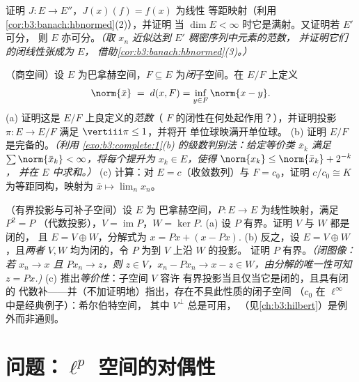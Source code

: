 \begin{exercise}[$\star\star$]\label{exo:b3:banach:10}
证明 $J \colon E \to E''$，$J(x)(f) = f(x)$ 为线性
等距映射（利用\cref{cor:b3:banach:hbnormed}(2)），并证明
当 $\dim E < \infty$ 时它是满射。又证明若 $E'$ 可分，
则 $E$ 亦可分。\emph{（取 $x_n$ 近似达到 $E'$ 稠密序列中元素的范数，
并证明它们的闭线性张成为 $E$，
借助\cref{cor:b3:banach:hbnormed}(3)。）}
\end{exercise}

\begin{exercise}[$\star\star$]\label{exo:b3:banach:11}
（商空间）设 $E$ 为巴拿赫空间，$F \subseteq
E$ 为\emph{闭}子空间。在 $E/F$ 上定义
\[
\norm{\bar x} \;=\; d(x, F) = \inf_{y\in F}\norm{x - y} .
\]
(a) 证明这是 $E/F$ 上良定义的\emph{范数}（
$F$ 的闭性在何处起作用？），并证明投影 $\pi
\colon E \to E/F$ 满足 $\vertiii\pi \leq 1$，并将开
单位球映满开单位球。
(b) 证明 $E/F$ 是完备的。\emph{（利用
\cref{exo:b3:complete:1}(b) 的级数判别法：给定等价类
$\bar x_k$ 满足 $\sum\norm{\bar x_k} < \infty$，将每个提升为
$x_k \in E$，使得 $\norm{x_k} \leq \norm{\bar x_k} + 2^{-k}$，
并在 $E$ 中求和。）}
(c) 计算：对 $E = c$（收敛数列）与 $F =
c_0$，证明 $c/c_0 \cong K$ 为等距同构，映射为 $\bar x \mapsto
\lim_nx_n$。
\end{exercise}

\begin{exercise}[$\star\star$]\label{exo:b3:banach:12}
（有界投影与可补子空间）设 $E$ 为
巴拿赫空间，$P \colon E \to E$ 为线性映射，满足 $P^2 = P$
（代数投影），$V = \operatorname{im}P$，$W =
\ker P$.
(a) 设 $P$ 有界。证明 $V$ 与 $W$ 都是闭的，
且 $E = V \oplus W$，分解式为 $x = Px + (x -
Px)$.
(b) 反之，设 $E = V \oplus W$，且\emph{两者} $V,
W$ 均为闭的，令 $P$ 为到 $V$ 上沿 $W$ 的投影。
证明 $P$ 有界。\emph{（闭图像：若 $x_n \to x$
且 $Px_n \to z$，则 $z \in V$，$x_n - Px_n \to x - z \in
W$，由分解的唯一性可知 $z =
Px$.)}
(c) 推出\emph{等价性}：子空间 $V$ 容许
有界投影当且仅当它是闭的，且具有闭的
代数补——并（不加证明地）指出，存在不具此性质的闭子空间
（$c_0$ 在
$\ell^\infty$ 中是经典例子）：希尔伯特空间，
其中 $V^\perp$ 总是可用，
（见\cref{ch:b3:hilbert}）是例外而非通则。
\end{exercise}

\section{问题：\texorpdfstring{$\ell^p$}%
{lp} 空间的对偶性}

